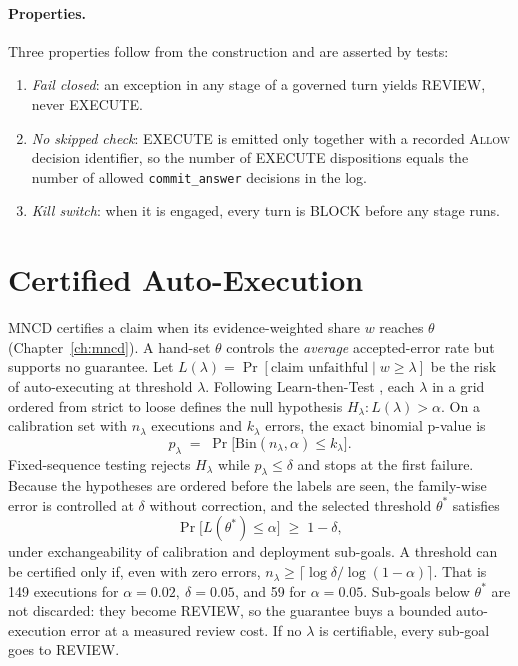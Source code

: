 \paragraph{Properties.} Three properties follow from the construction and are asserted by tests:
\begin{enumerate}
  \item \emph{Fail closed}: an exception in any stage of a governed turn yields REVIEW, never EXECUTE.
  \item \emph{No skipped check}: EXECUTE is emitted only together with a recorded \textsc{Allow}
        decision identifier, so the number of EXECUTE dispositions equals the number of allowed
        \texttt{commit\_answer} decisions in the log.
  \item \emph{Kill switch}: when it is engaged, every turn is BLOCK before any stage runs.
\end{enumerate}

\section{Certified Auto-Execution}
\label{sec:gov-ltt}

MNCD certifies a claim when its evidence-weighted share $w$ reaches $\theta$
(Chapter~\ref{ch:mncd}). A hand-set $\theta$ controls the \emph{average} accepted-error rate but
supports no guarantee. Let $L(\lambda)=\Pr[\text{claim unfaithful}\mid w\ge\lambda]$ be the risk of
auto-executing at threshold $\lambda$. Following Learn-then-Test \citep{angelopoulos2025ltt}, each
$\lambda$ in a grid ordered from strict to loose defines the null hypothesis $H_\lambda: L(\lambda)>\alpha$.
On a calibration set with $n_\lambda$ executions and $k_\lambda$ errors, the exact binomial p-value is
\begin{equation}
  p_\lambda \;=\; \Pr\big[\mathrm{Bin}(n_\lambda,\alpha)\le k_\lambda\big].
  \label{eq:gov-pval}
\end{equation}
Fixed-sequence testing rejects $H_\lambda$ while $p_\lambda\le\delta$ and stops at the first failure.
Because the hypotheses are ordered before the labels are seen, the family-wise error is controlled at
$\delta$ without correction, and the selected threshold $\theta^\ast$ satisfies
\begin{equation}
  \Pr\big[L(\theta^\ast)\le\alpha\big] \;\ge\; 1-\delta ,
  \label{eq:gov-guarantee}
\end{equation}
under exchangeability of calibration and deployment sub-goals. A threshold can be certified only if,
even with zero errors, $n_\lambda \ge \lceil \log\delta / \log(1-\alpha)\rceil$. That is 149 executions
for $\alpha=0.02,\ \delta=0.05$, and 59 for $\alpha=0.05$. Sub-goals below $\theta^\ast$ are not
discarded: they become REVIEW, so the guarantee buys a bounded auto-execution error at a measured
review cost. If no $\lambda$ is certifiable, every sub-goal goes to REVIEW.

